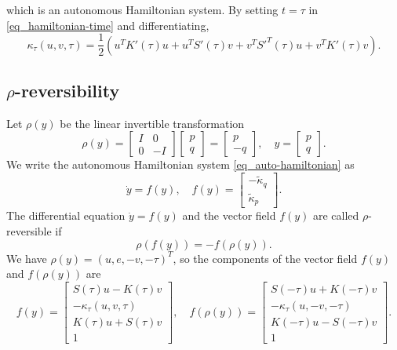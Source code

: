 \documentclass[11pt]{article}
\begin{document}
which is an autonomous Hamiltonian system. By setting $t=\tau$ in \eqref{eq_hamiltonian-time} and
differentiating,
\begin{equation}\label{eq_hamiltonian-time-der}
\kappa_\tau(u,v,\tau) = \frac{1}{2}
\left(
  u^T K'(\tau)u + u^TS'(\tau)v +  v^T S'^T(\tau)u +  v^T K'(\tau)v
\right).
\end{equation}


\subsection{$\rho$-reversibility}
Let $\rho(y)$ be the linear invertible transformation
\[
\rho(y) =
\begin{bmatrix}
  I & 0 \\
  0 & -I
\end{bmatrix}
\begin{bmatrix}
  p\\
  q
\end{bmatrix}=
\begin{bmatrix}
  p\\
  -q
\end{bmatrix},\quad
y = \begin{bmatrix}
  p \\q
\end{bmatrix}.
\]
We write the autonomous Hamiltonian system \eqref{eq_auto-hamiltonian} as
\[
\dot{y} = f(y),\quad
%
f(y) = \begin{bmatrix}
  -\tilde{\kappa}_q \\
  \tilde{\kappa}_p
\end{bmatrix}.
\]
The differential equation $\dot{y}=f(y)$ and the vector field $f(y)$ are
called $\rho$-reversible if
\begin{equation}\label{eq_rho-reverse}
\rho(f(y)) = -f(\rho(y)).
\end{equation}
We have $\rho(y) = (u, e, -v, -\tau)^T$, so the components of the vector field $f(y)$ and $f(\rho(y))$ are
\[
f(y) =
\begin{bmatrix} S(\tau) u - K(\tau)v\\
  -\kappa_\tau(u,v,\tau)\\
  K(\tau) u + S(\tau) v\\
  1
\end{bmatrix},\quad
%
f(\rho(y)) = 
\begin{bmatrix}
  S(-\tau) u + K(-\tau)v\\
  -\kappa_\tau(u,-v,-\tau)\\
  K(-\tau) u - S(-\tau) v\\
  1
\end{bmatrix}.
\]
\end{document}
